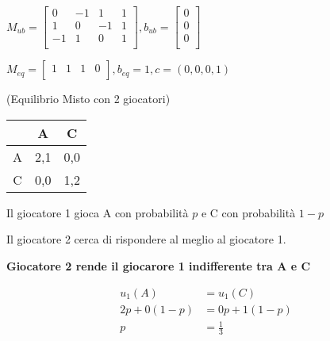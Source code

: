 \begin{center}
    
    $M_{ub} = \begin{bmatrix}
        0 & -1 & 1 & 1 \\
        1 & 0 & -1 & 1 \\
        -1 & 1 & 0 & 1 \\
    \end{bmatrix}, b_{ub} = \begin{bmatrix}
        0 \\
        0 \\
        0 \\
    \end{bmatrix}
    $

    $M_{eq} = \begin{bmatrix}
        1 & 1 & 1 & 0 \\
    \end{bmatrix}, b_{eq} = 1, c = (0,0,0,1)$
\end{center}
    
    




\begin{esempio}(Equilibrio Misto con 2 giocatori)
\end{esempio}

\begin{table}[h]
    \begin{center}
        \begin{tabular}{|c|c|c|}
            \hline
              & A   & C   \\
            \hline
            A & 2,1 & 0,0 \\
            \hline
            C & 0,0 & 1,2 \\
            \hline
        \end{tabular}
    \end{center}
\end{table}

Il giocatore 1 gioca A con probabilità $p$ e C con probabilità $1-p$

Il giocatore 2 cerca di rispondere al meglio al giocatore 1.

\textbf{Giocatore 2 rende il giocarore 1 indifferente tra A e C}

\begin{equation}
    \begin{aligned}
        u_1(A)      & = u_1(C)      \\
        2p + 0(1-p) & = 0p + 1(1-p) \\
        p           & = \frac{1}{3}
    \end{aligned}
\end{equation}

